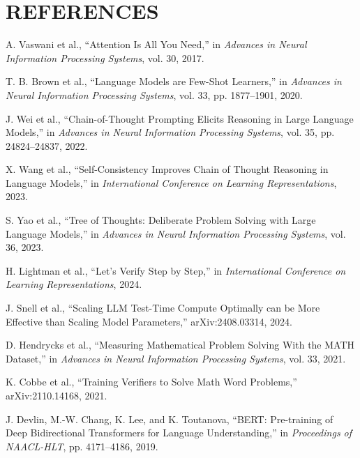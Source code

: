 \documentclass[12pt,a4paper,titlepage]{report}
\begin{document}
\chapter*{REFERENCES}
\begin{enumerate}[label={[\arabic*]}, leftmargin=*, itemsep=0.45em, align=left]

\item A. Vaswani et al., ``Attention Is All You Need,'' in \textit{Advances in Neural Information Processing Systems}, vol. 30, 2017.

\item T. B. Brown et al., ``Language Models are Few-Shot Learners,'' in \textit{Advances in Neural Information Processing Systems}, vol. 33, pp. 1877--1901, 2020.

\item J. Wei et al., ``Chain-of-Thought Prompting Elicits Reasoning in Large Language Models,'' in \textit{Advances in Neural Information Processing Systems}, vol. 35, pp. 24824--24837, 2022.

\item X. Wang et al., ``Self-Consistency Improves Chain of Thought Reasoning in Language Models,'' in \textit{International Conference on Learning Representations}, 2023.

\item S. Yao et al., ``Tree of Thoughts: Deliberate Problem Solving with Large Language Models,'' in \textit{Advances in Neural Information Processing Systems}, vol. 36, 2023.

\item H. Lightman et al., ``Let's Verify Step by Step,'' in \textit{International Conference on Learning Representations}, 2024.

\item J. Snell et al., ``Scaling LLM Test-Time Compute Optimally can be More Effective than Scaling Model Parameters,'' arXiv:2408.03314, 2024.

\item D. Hendrycks et al., ``Measuring Mathematical Problem Solving With the MATH Dataset,'' in \textit{Advances in Neural Information Processing Systems}, vol. 33, 2021.

\item K. Cobbe et al., ``Training Verifiers to Solve Math Word Problems,'' arXiv:2110.14168, 2021.

\item J. Devlin, M.-W. Chang, K. Lee, and K. Toutanova, ``BERT: Pre-training of Deep Bidirectional Transformers for Language Understanding,'' in \textit{Proceedings of NAACL-HLT}, pp. 4171--4186, 2019.


\end{enumerate}
\end{document}
